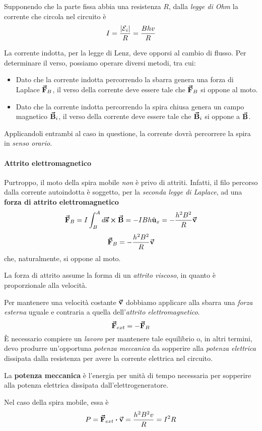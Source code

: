 Supponendo che la parte fissa abbia una resistenza $R$, dalla \textit{legge di Ohm} la corrente che circola nel circuito è
\begin{equation}
	I=\frac{\abs{\mathcal{E}_i}}{R}=\frac{Bhv}{R}
\end{equation}
\begin{observe}
	La corrente indotta, per la legge di Lenz, deve opporsi al cambio di flusso. Per determinare il verso, possiamo operare diversi metodi, tra cui:
	\begin{itemize}
		\item Dato che la corrente indotta percorrendo la sbarra genera una forza di Laplace $\vb*{\va{F}}_B$, il verso della corrente deve essere tale che $\vb*{\va{F}}_B$ si oppone al moto.
		\item Dato che la corrente indotta percorrendo la spira chiusa genera un campo magnetico $\vb*{\va{B}}_i$, il verso della corrente deve essere tale che $\vb*{\va{B}}_i$ si oppone a $\vb*{\va{B}}$.
	\end{itemize}
	Applicandoli entrambi al caso in questione, la corrente dovrà percorrere la spira in \textit{senso orario}.
\end{observe}
\paragraph{Attrito elettromagnetico}
Purtroppo, il moto della spira mobile \textit{non} è privo di attriti. Infatti, il filo percorso dalla corrente autoindotta è soggetto, per la \textit{seconda legge di Laplace}, ad una \textbf{forza di attrito elettromagnetico}
\begin{equation*}
	\vb*{\va{F}}_B=I\int_{B}^{A}d\vb*{\va{s}}\cross\vb*{\va{B}}=-IBh\hat{\mathbf{u}}_x=-\frac{h^2B^2}{R}\vb*{\va{v}}
\end{equation*}
\begin{equation}
	\vb*{\va{F}}_B=-\frac{h^2B^2}{R}\vb*{\va{v}}
\end{equation}
che, naturalmente, si oppone al moto.
\begin{observe}
	La forza di attrito assume la forma di un \textit{attrito viscoso}, in quanto è proporzionale alla velocità.
\end{observe}
Per mantenere una velocità costante $\vb*{\va{v}}$ dobbiamo applicare alla sbarra una \textit{forza esterna} uguale e contraria a quella dell'\textit{attrito elettromagnetico}.
\begin{equation*}
	\vb*{\va{F}}_{ext}=-\vb*{\va{F}}_B
\end{equation*}
È necessario compiere un \textit{lavoro} per mantenere tale equilibrio o, in altri termini, devo produrre un'opportuna \textit{potenza meccanica} da sopperire alla \textit{potenza elettrica} dissipata dalla resistenza per avere la corrente elettrica nel circuito.
\begin{define}
	La \textbf{potenza meccanica} è l'energia per unità di tempo necessaria per sopperire alla potenza elettrica dissipata dall'elettrogeneratore.
\end{define}
Nel caso della spira mobile, essa è
\begin{equation}
	P=\vba{F}_{ext}\vdot \vba{v}=\frac{h^2B^2v}{R}=I^2R
\end{equation}
